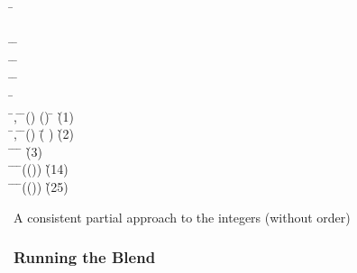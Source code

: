 \begin{listing}[!ht]
\begin{mdframed}
\begin{hetcasl}
\SPEC \= \Ax{=}\\
\> \SORT {}\\
\> \OP \=\Ax{\_\_}\Ax{+}\Ax{\_\_} \Ax{:} \= \Ax{\times}  \Ax{\rightarrow} \\
\> \OP \= \Ax{:} \= \Ax{\rightarrow} \\
\> \OP \= \Ax{:} \= \Ax{\rightarrow} \\
\> \OP \= \Ax{:} \\
\> \Ax{\forall} \=,  \Ax{:}  \=\Ax{\bullet} \=() \Ax{=} () \Ax{\Rightarrow} \= \Ax{=}  \`{\small{}\KW{\%}(1)\KW{\%}}\\
\> \Ax{\forall} \=,  \Ax{:}  \=\Ax{\bullet} \=() \Ax{+}  \Ax{=} (\= \Ax{+} ) \`{\small{}\KW{\%}(2)\KW{\%}}\\
\> \Ax{\forall} \= \Ax{:}  \=\Ax{\bullet} \= \Ax{+}  \Ax{=}  \`{\small{}\KW{\%}(3)\KW{\%}}\\
\> \Ax{\forall} \= \Ax{:}  \=\Ax{\bullet} \=(()) \Ax{=}  \`{\small{}\KW{\%}(1\Ax{\_}4)\KW{\%}}\\
\> \Ax{\forall} \= \Ax{:}  \=\Ax{\bullet} \=(()) \Ax{=}  \`{\small{}\KW{\%}(2\Ax{\_}5)\KW{\%}}\\
\end{hetcasl}
\end{mdframed}
\caption{A consistent partial approach to the integers (without order)}
\label{fig:integers}
\end{listing}

\subsubsection{Running the Blend}

